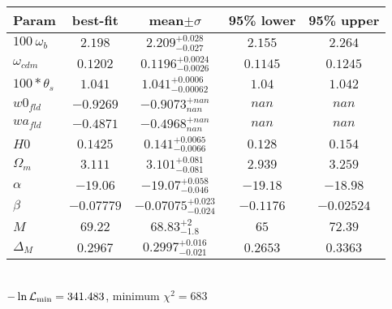 \begin{tabular}{|l|c|c|c|c|} 
 \hline 
Param & best-fit & mean$\pm\sigma$ & 95\% lower & 95\% upper \\ \hline 
$100~\omega_{b }$ &$2.198$ & $2.209_{-0.027}^{+0.028}$ & $2.155$ & $2.264$ \\ 
$\omega_{cdm }$ &$0.1202$ & $0.1196_{-0.0026}^{+0.0024}$ & $0.1145$ & $0.1245$ \\ 
$100*\theta_{s }$ &$1.041$ & $1.041_{-0.00062}^{+0.0006}$ & $1.04$ & $1.042$ \\ 
$w0_{fld }$ &$-0.9269$ & $-0.9073_{nan}^{+nan}$ & $nan$ & $nan$ \\ 
$wa_{fld }$ &$-0.4871$ & $-0.4968_{nan}^{+nan}$ & $nan$ & $nan$ \\ 
$H0$ &$0.1425$ & $0.141_{-0.0066}^{+0.0065}$ & $0.128$ & $0.154$ \\ 
$\Omega_{m }$ &$3.111$ & $3.101_{-0.081}^{+0.081}$ & $2.939$ & $3.259$ \\ 
$\alpha$ &$-19.06$ & $-19.07_{-0.046}^{+0.058}$ & $-19.18$ & $-18.98$ \\ 
$\beta$ &$-0.07779$ & $-0.07075_{-0.024}^{+0.023}$ & $-0.1176$ & $-0.02524$ \\ 
$M$ &$69.22$ & $68.83_{-1.8}^{+2}$ & $65$ & $72.39$ \\ 
$\Delta_{M }$ &$0.2967$ & $0.2997_{-0.021}^{+0.016}$ & $0.2653$ & $0.3363$ \\ 
\hline 
 \end{tabular} \\ 
$-\ln{\cal L}_\mathrm{min} =341.483$, minimum $\chi^2=683$ \\ 

